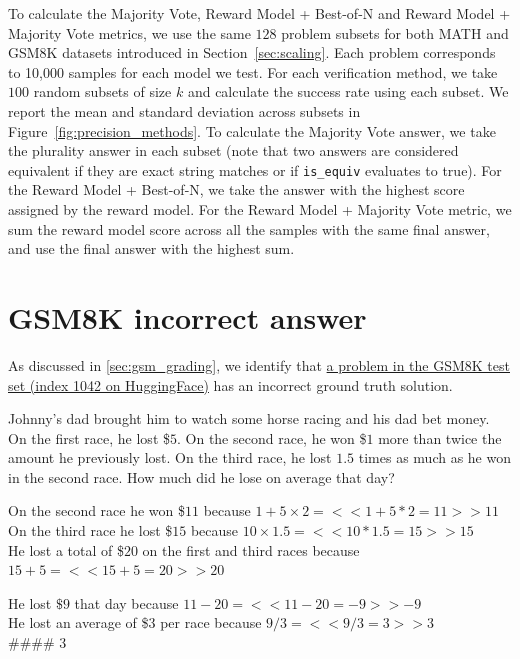 \documentclass[11pt]{article}
\begin{document}
To calculate the Majority Vote, Reward Model + Best-of-N and Reward Model + Majority Vote metrics, we use the same $128$ problem subsets for both MATH and GSM8K datasets introduced in Section~\ref{sec:scaling}.
Each problem corresponds to 10,000 samples for each model we test.
For each verification method, we take $100$ random subsets of size $k$ and calculate the success rate using each subset.
We report the mean and standard deviation across subsets in Figure~\ref{fig:precision_methods}. 
To calculate the Majority Vote answer, we take the plurality answer in each subset (note that two answers are considered equivalent if they are exact string matches or if \verb|is_equiv| evaluates to true).
For the Reward Model + Best-of-N, we take the answer with the highest score assigned by the reward model.
For the Reward Model + Majority Vote metric, we sum the reward model score across all the samples with the same final answer, and use the final answer with the highest sum.

\newpage{}
\section{GSM8K incorrect answer}
\label{sec:gsm_bad}
As discussed in \ref{sec:gsm_grading}, we identify that  \href{https://huggingface.co/datasets/openai/gsm8k/viewer/main/test?row=1042}{a problem in the GSM8K test set (index 1042 on HuggingFace)} has an incorrect ground truth solution.


\begin{tcolorbox}[
    colback=gray!5,
    colframe=gray!75,
    title=Question,
    fonttitle=\bfseries
]
Johnny's dad brought him to watch some horse racing and his dad bet money. On the first race, he lost \$$5$. On the second race, he won \$$1$ more than twice the amount he previously lost. On the third race, he lost $1.5$ times as much as he won in the second race. How much did he lose on average that day?
\end{tcolorbox}

\begin{tcolorbox}[
    colback=gray!5,
    colframe=red!75,
    title=Answer,
    fonttitle=\bfseries
]
On the second race he won \$$11$ because $1+ 5 \times 2 = <<1+5*2=11>>11$ \\
On the third race he lost \$$15$ because $10 \times 1.5 = <<10*1.5=15>>15$ \\
He lost a total of \$$20$ on the first and third races because $15 + 5 = <<15+5=20>>20$ 

He lost $\$9$ that day because $11 - 20 = <<11-20=-9>>-9$ \\
He lost an average of \$$3$ per race because $9 / 3 = <<9/3=3>>3$ \\
\#\#\#\# 3
\end{tcolorbox}
\end{document}
